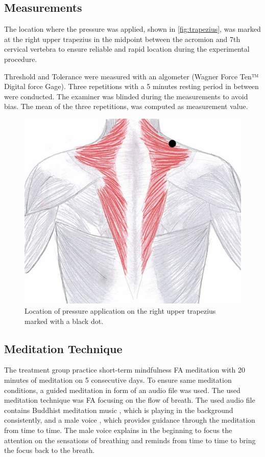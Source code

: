 \subsection{Measurements}%
The location where the pressure was applied, shown in \autoref{fig:trapezius}, was marked at the right upper trapezius in the midpoint between the acromion and 7th cervical vertebra to ensure reliable and rapid location during the experimental procedure. 

Threshold and Tolerance were measured with an algometer (Wagner Force Ten™ Digital force Gage). Three repetitions with a 5 minutes resting period in between were conducted. The examiner was blinded during the measurements to avoid bias. The mean of the three repetitions, was computed as measurement value. 

\begin{figure}[H]
\centering
\includegraphics[width=.7\columnwidth]{../figures/trapezius}
\caption{Location of pressure application on the right upper trapezius marked with a black dot.}
\label{fig:trapezius}
\end{figure} \vspace{-.5cm}


\subsection{Meditation Technique}
The treatment group practice short-term mindfulness FA meditation with 20 minutes of meditation on 5 consecutive days. To ensure same meditation conditions, a guided meditation in form of an audio file was used. The used meditation technique was FA focusing on the flow of breath. The used audio file contains Buddhist meditation music \cite{BuddhistMusic}, which is playing in the background consistently, and a male voice \cite{Noyce2018}, which provides guidance through the meditation from time to time.  The male voice explains in the beginning to focus the attention on the sensations of breathing and reminds from time to time to bring the focus back to the breath. 

